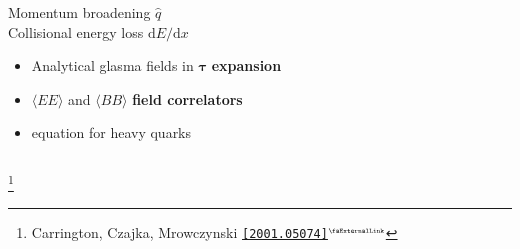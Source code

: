\documentclass[aspectratio=169,11pt,usenames,dvipsnames]{beamer}
\renewcommand{\thefootnote}{\color{customblue}\faPaperPlaneO}
\newcommand\blfootnote[1]{%
  \begingroup
  \renewcommand\thefootnote{}\footnote{#1}%
  \addtocounter{footnote}{-1}%
  \endgroup
}
\begin{document}
\begin{frame}[t]
\begin{columns}[onlytextwidth,t]
        \begin{center}
            {\Large\color{palteal} Momentum broadening $\hat{q}$ \\[5pt] Collisional energy loss $\mathrm{d}E/\mathrm{d}x$ \\[10pt]}
            \footnotesize
                \begin{itemize}
                \item {\color{lightgray}Analytical glasma fields in $\boldsymbol{\tau}$ \textbf{expansion}}
                \item {\color{lightgray}$\langle EE\rangle$ and $\langle BB\rangle$ {\bfseries field correlators}}
                \item {\color{lightgray}{\bfseries Fokker-Planck} equation for heavy quarks}
            \end{itemize}
        \end{center}
    \end{columns}
    \blfootnote{\scriptsize Carrington, Czajka, Mrowczynski \href{https://arxiv.org/abs/2001.05074}{\color{palgold}\texttt{[2001.05074]}$^\text{\tiny\faExternalLink}$}}
\end{frame}


\end{document}
